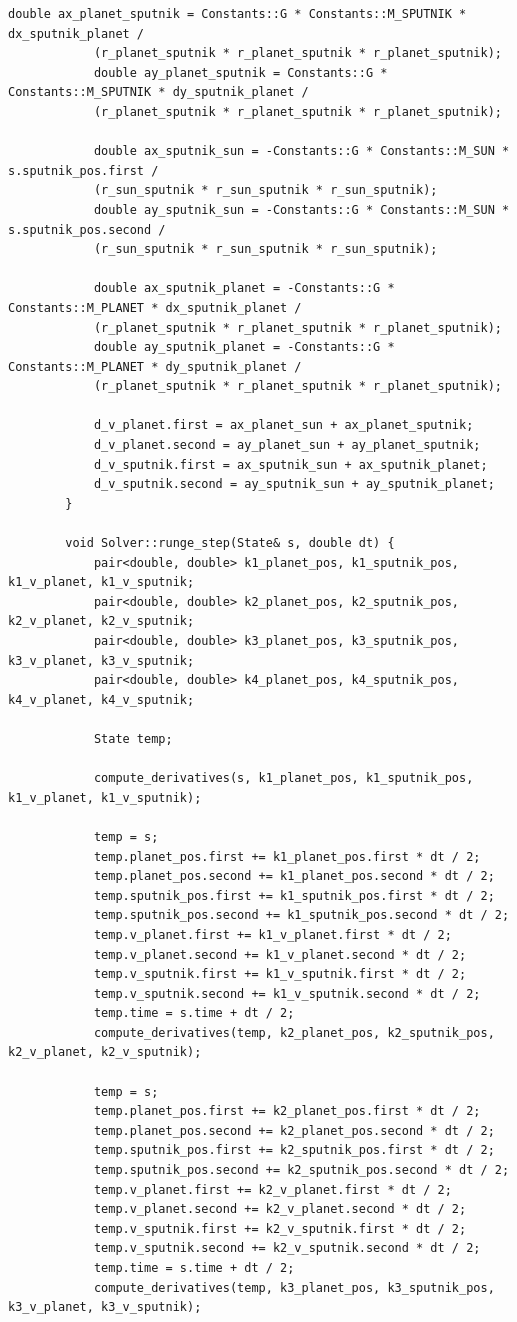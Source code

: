 \documentclass[14pt,a4paper]{extarticle}
\theoremstyle{plain}
\begin{document}
\begin{lstlisting}[title=solver.cpp, gobble=16, breaklines=true, breakatwhitespace=true]
			double ax_planet_sputnik = Constants::G * Constants::M_SPUTNIK * dx_sputnik_planet /
			(r_planet_sputnik * r_planet_sputnik * r_planet_sputnik);
			double ay_planet_sputnik = Constants::G * Constants::M_SPUTNIK * dy_sputnik_planet /
			(r_planet_sputnik * r_planet_sputnik * r_planet_sputnik);
			
			double ax_sputnik_sun = -Constants::G * Constants::M_SUN * s.sputnik_pos.first /
			(r_sun_sputnik * r_sun_sputnik * r_sun_sputnik);
			double ay_sputnik_sun = -Constants::G * Constants::M_SUN * s.sputnik_pos.second /
			(r_sun_sputnik * r_sun_sputnik * r_sun_sputnik);
			
			double ax_sputnik_planet = -Constants::G * Constants::M_PLANET * dx_sputnik_planet /
			(r_planet_sputnik * r_planet_sputnik * r_planet_sputnik);
			double ay_sputnik_planet = -Constants::G * Constants::M_PLANET * dy_sputnik_planet /
			(r_planet_sputnik * r_planet_sputnik * r_planet_sputnik);
			
			d_v_planet.first = ax_planet_sun + ax_planet_sputnik;
			d_v_planet.second = ay_planet_sun + ay_planet_sputnik;
			d_v_sputnik.first = ax_sputnik_sun + ax_sputnik_planet;
			d_v_sputnik.second = ay_sputnik_sun + ay_sputnik_planet;
		}
		
		void Solver::runge_step(State& s, double dt) {
			pair<double, double> k1_planet_pos, k1_sputnik_pos, k1_v_planet, k1_v_sputnik;
			pair<double, double> k2_planet_pos, k2_sputnik_pos, k2_v_planet, k2_v_sputnik;
			pair<double, double> k3_planet_pos, k3_sputnik_pos, k3_v_planet, k3_v_sputnik;
			pair<double, double> k4_planet_pos, k4_sputnik_pos, k4_v_planet, k4_v_sputnik;
			
			State temp;
			
			compute_derivatives(s, k1_planet_pos, k1_sputnik_pos, k1_v_planet, k1_v_sputnik);
			
			temp = s;
			temp.planet_pos.first += k1_planet_pos.first * dt / 2;
			temp.planet_pos.second += k1_planet_pos.second * dt / 2;
			temp.sputnik_pos.first += k1_sputnik_pos.first * dt / 2;
			temp.sputnik_pos.second += k1_sputnik_pos.second * dt / 2;
			temp.v_planet.first += k1_v_planet.first * dt / 2;
			temp.v_planet.second += k1_v_planet.second * dt / 2;
			temp.v_sputnik.first += k1_v_sputnik.first * dt / 2;
			temp.v_sputnik.second += k1_v_sputnik.second * dt / 2;
			temp.time = s.time + dt / 2;
			compute_derivatives(temp, k2_planet_pos, k2_sputnik_pos, k2_v_planet, k2_v_sputnik);
			
			temp = s;
			temp.planet_pos.first += k2_planet_pos.first * dt / 2;
			temp.planet_pos.second += k2_planet_pos.second * dt / 2;
			temp.sputnik_pos.first += k2_sputnik_pos.first * dt / 2;
			temp.sputnik_pos.second += k2_sputnik_pos.second * dt / 2;
			temp.v_planet.first += k2_v_planet.first * dt / 2;
			temp.v_planet.second += k2_v_planet.second * dt / 2;
			temp.v_sputnik.first += k2_v_sputnik.first * dt / 2;
			temp.v_sputnik.second += k2_v_sputnik.second * dt / 2;
			temp.time = s.time + dt / 2;
			compute_derivatives(temp, k3_planet_pos, k3_sputnik_pos, k3_v_planet, k3_v_sputnik);
			

\end{lstlisting}
\end{document}
